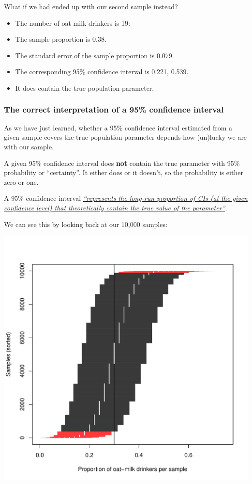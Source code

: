 \documentclass[
  11pt,
]{article}
\providecommand{\tightlist}{%
  \setlength{\itemsep}{0pt}\setlength{\parskip}{0pt}}
\begin{document}
What if we had ended up with our second sample instead?

\begin{itemize}
\tightlist
\item
  The number of oat-milk drinkers is 19:
\item
  The sample proportion is 0.38.
\item
  The standard error of the sample proportion is 0.079.
\item
  The corresponding 95\% confidence interval is 0.221, 0.539.
\item
  It does contain the true population parameter.
\end{itemize}

\hypertarget{the-correct-interpretation-of-a-95-confidence-interval}{%
\subsubsection{The correct interpretation of a 95\% confidence interval}\label{the-correct-interpretation-of-a-95-confidence-interval}}

As we have just learned, whether a 95\% confidence interval estimated from a given sample covers the true population parameter depends how (un)lucky we are with our sample.

A given 95\% confidence interval does \textbf{not} contain the true parameter with 95\% probability or ``certainty''. It either does or it doesn't, so the probability is either zero or one.

A 95\% confidence interval \href{https://en.wikipedia.org/wiki/Confidence_interval}{\emph{``represents the long-run proportion of CIs (at the given confidence level) that theoretically contain the true value of the parameter''}}.

We can see this by looking back at our 10,000 samples:

\begin{center}\includegraphics{01-01-lec_files/figure-latex/sim-cis-1} \end{center}
\end{document}
